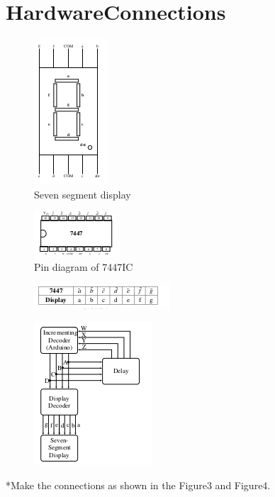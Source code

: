 \documentclass[10pt, a4paper]{article}
\begin{document}
   
\section{HardwareConnections}
\begin{figure}
    \centering
    \includegraphics{seven.png}
    \caption{Seven segment display}
    \label{fig:my_label}
\end{figure}
\begin{figure}
    \centering
    \includegraphics{7447ic.png}
    \caption{Pin diagram of 7447IC}
    \label{fig:my_label}
\end{figure}
\begin{figure}
    \centering
    \includegraphics{sevenseg.png}
    \caption{}
    \label{fig:my_label}
\end{figure}
\begin{figure}
    \centering
    \includegraphics{connect.png}
    \caption{}
    \label{fig:my_label}
\end{figure}

*Make the connections as shown in the Figure3 and Figure4.
\end{document}
